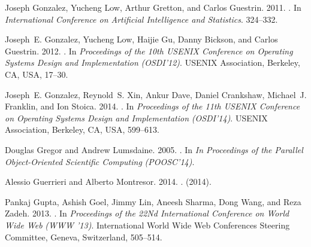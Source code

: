 \documentclass[reprint,twocolumn,showpacs,preprintnumbers,amsmath, aps,pre,amssymb]{revtex4-1}
\begin{document}
\begin{thebibliography}{00}
{
{Joseph Gonzalez}, {Yucheng Low}, {Arthur Gretton}, {and} {Carlos Guestrin}.
  2011.
\newblock {}. In {\em International Conference on Artificial
  Intelligence and Statistics}. 324--332.
\newblock


{Joseph~E. Gonzalez}, {Yucheng Low}, {Haijie Gu}, {Danny Bickson}, {and}
  {Carlos Guestrin}. 2012.
\newblock {}. In {\em Proceedings of the 10th USENIX Conference on
  Operating Systems Design and Implementation} {\em (OSDI'12)}. USENIX
  Association, Berkeley, CA, USA, 17--30.
\newblock
{}


{Joseph~E. Gonzalez}, {Reynold~S. Xin}, {Ankur Dave}, {Daniel Crankshaw},
  {Michael~J. Franklin}, {and} {Ion Stoica}. 2014.
\newblock {}. In {\em Proceedings of the 11th USENIX Conference on Operating
  Systems Design and Implementation} {\em (OSDI'14)}. USENIX Association,
  Berkeley, CA, USA, 599--613.
\newblock
{}


{Douglas Gregor} {and} {Andrew Lumsdaine}. 2005.
\newblock {}. In {\em In Proceedings of the Parallel Object-Oriented
  Scientific Computing} {\em (POOSC'14)}.
\newblock


{Alessio Guerrieri} {and} {Alberto Montresor}. 2014.
\newblock {}.
 (2014).
\newblock
{}


{Pankaj Gupta}, {Ashish Goel}, {Jimmy Lin}, {Aneesh Sharma}, {Dong Wang}, {and}
  {Reza Zadeh}. 2013.
\newblock {}. In {\em
  Proceedings of the 22Nd International Conference on World Wide Web} {\em (WWW
  '13)}. International World Wide Web Conferences Steering Committee, Geneva,
  Switzerland, 505--514.
\newblock
{}


}
\end{thebibliography}
\end{document}
